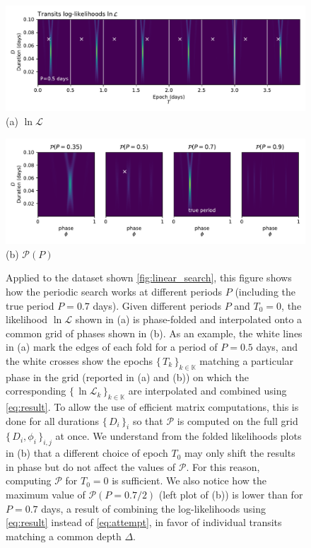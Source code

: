 \documentclass{aastex631}
\newcommand{\set}[1]{\{\,#1\,\}}
\begin{document}
\begin{figure}[H]
    \centering
    \includegraphics[width=0.8\linewidth]{principle_periodic_0.pdf}\\
    {(a) $\ln \mathcal{L}$}

    \centering
    \includegraphics[width=0.8\linewidth]{principle_periodic_1.pdf}\\
    {(b) $\mathcal{P}(P)$}
\end{figure}

\begin{figure}[H]
    \caption{Applied to the dataset shown \autoref{fig:linear_search}, this figure shows how the periodic search works at different periods $P$ (including the true period $P = 0.7$ days). Given different periods $P$ and $T_0=0$, the likelihood $\ln\mathcal{L}$ shown in (a) is phase-folded and interpolated onto a common grid of phases shown in (b). As an example, the white lines in (a) mark the edges of each fold for a period of $P=0.5$ days, and the white crosses show the epochs $\set{T_k}_{k\in\mathbb{K}}$ matching a particular phase in the grid (reported in (a) and (b)) on which the corresponding $\set{\ln \mathcal{L}_k}_{k\in\mathbb{K}}$ are interpolated and combined using \autoref{eq:result}. To allow the use of efficient matrix computations, this is done for all durations $\set{D_i}_i$ so that $\mathcal{P}$ is computed on the full grid $\set{D_i, \phi_i}_{i, j}$ at once. We understand from the folded likelihoods plots in (b) that a different choice of epoch $T_0$ may only shift the results in phase but do not affect the values of $\mathcal{P}$. For this reason, computing $\mathcal{P}$ for $T_0=0$ is sufficient. We also notice how the maximum value of $\mathcal{P}(P=0.7/2)$ (left plot of (b)) is lower than for $P=0.7$ days, a result of combining the log-likelihoods using \autoref{eq:result} instead of \autoref{eq:attempt}, in favor of individual transits matching a common depth $\Delta$.}
    \label{fig:periodic_search}
\end{figure}
\end{document}
